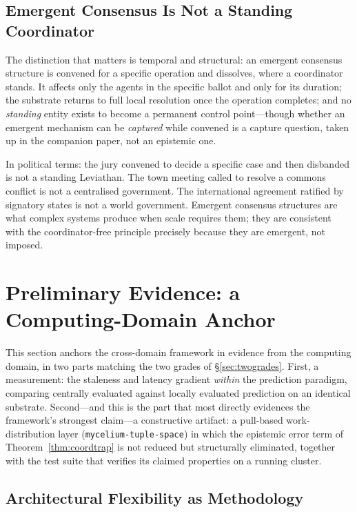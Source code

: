 \documentclass[11pt]{article}
\theoremstyle{definition}
\theoremstyle{plain}
\theoremstyle{plain}
\begin{document}
\subsection{Emergent Consensus Is Not a Standing Coordinator}

The distinction that matters is temporal and structural: an emergent consensus
structure is convened for a specific operation and dissolves, where a coordinator
stands. It affects only the agents in the specific ballot and only for its duration;
the substrate returns to full local resolution once the operation completes; and no
\emph{standing} entity exists to become a permanent control point---though whether an
emergent mechanism can be \emph{captured} while convened is a capture question, taken
up in the companion paper, not an epistemic one.

In political terms: the jury convened to decide a specific case and then
disbanded is not a standing Leviathan. The town meeting called to resolve a
commons conflict is not a centralised government. The international agreement
ratified by signatory states is not a world government. Emergent consensus
structures are what complex systems produce when scale requires them; they
are consistent with the coordinator-free principle precisely because they
are emergent, not imposed.

\section{Preliminary Evidence: a Computing-Domain Anchor}
\label{sec:empirical}

This section anchors the cross-domain framework in evidence from the
computing domain, in two parts matching the two grades of
\S\ref{sec:twogrades}. First, a measurement: the staleness and latency
gradient \emph{within} the prediction paradigm, comparing centrally
evaluated against locally evaluated prediction on an identical substrate.
Second---and this is the part that most directly evidences the framework's
strongest claim---a constructive artifact: a pull-based work-distribution layer
(\texttt{mycelium-tuple-space}) in which the epistemic error term of
Theorem~\ref{thm:coordtrap} is not reduced but structurally eliminated,
together with the test suite that verifies its claimed properties on a
running cluster.

\subsection{Architectural Flexibility as Methodology}
\end{document}
